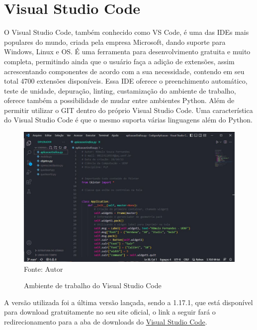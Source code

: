     \section{Visual Studio Code}
	O Visual Studio Code, também conhecido como VS Code, é uma das IDEs mais populares do mundo, criada pela empresa Microsoft, dando suporte para Windows, Linux e OS. É uma ferramenta para desenvolvimento gratuita e muito completa, permitindo ainda que o usuário faça a adição de extensões, assim acrescentando componentes de acordo com a sua necessidade, contendo em seu total 4700 extensões disponíveis. Essa IDE oferece o preenchimento automático, teste de unidade, depuração, linting, custamização do ambiente de trabalho, oferece também a possibilidade de mudar entre ambientes Python. Além de permitir utilizar o GIT dentro do próprio Visual Studio Code. Uma característica do Visual Studio Code é que o mesmo suporta várias linguagens além do Python.
    
    \begin{figure}[H]
    	\begin{center}
    		\caption{Ambiente de trabalho do Visual Studio Code} \label{ling1}
    		\includegraphics[width=15cm]{vscode.JPG} \\
    		{\tiny \sf Fonte:{ Autor}}
    	\end{center}
    \end{figure}
    
    A versão utilizada foi a última versão lançada, sendo a 1.17.1, que está disponível para download gratuitamente no seu site oficial, o link a seguir fará o redirecionamento para a aba de downloads do \href{https://code.visualstudio.com}{Visual Studio Code}.
    
     